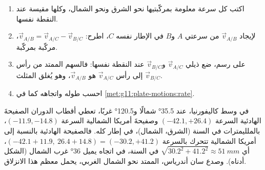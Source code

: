 \begin{method}\label{met:g11:plate-motions:triangle}
\begin{enumerate}
  \item اكتب كل سرعة معلومة بمركّبتيها نحو الشرق ونحو الشمال، وكلها
        مقيسة عند النقطة نفسها.
  \item لإيجاد $\vec v_{A/B}$ من سرعتي $A$ و$B$ في الإطار
        نفسه $C$، اطرح: $\vec v_{A/B} = \vec v_{A/C} - \vec v_{B/C}$،
        مركّبة بمركّبة.
  \item على رسم، ضع ذيلي $\vec v_{A/C}$ و$\vec v_{B/C}$ عند
        النقطة نفسها: فالسهم الممتد من رأس $\vec v_{B/C}$ إلى رأس
        $\vec v_{A/C}$ هو $\vec v_{A/B}$، وهو يُغلق المثلث.
  \item احسب طوله واتجاهه كما في
        \cref{met:g11:plate-motions:rate}.
\end{enumerate}
\end{method}

\begin{example}\label{ex:g11:plate-motions:san-andreas}
في وسط كاليفورنيا، عند \ang{35.5} شمالًا و\ang{120.5} غربًا، تعطي أقطاب
الدوران الصفيحةَ الهادئية السرعة $(-42.1, +26.4)$ وصفيحةَ أمريكا
الشمالية السرعة $(-11.9, -14.8)$، بالملليمترات في السنة (الشرق، الشمال)، في
إطار  كله. فالصفيحة الهادئية بالنسبة إلى أمريكا الشمالية
تتحرك بالسرعة $(-42.1 + 11.9,\ 26.4 + 14.8) = (-30.2, +41.2)$، أي
$\sqrt{30.2^2 + 41.2^2} \approx \qty{51}{mm}$ في السنة، في اتجاه يميل
\ang{36} غرب الشمال (الشكل أدناه). وصدع سان
أندرياس، الممتد نحو الشمال الغربي، يحمل معظم هذا الانزلاق.
\end{example}

